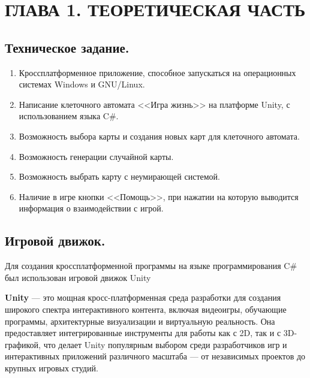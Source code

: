 \chapter{\label{ch:ch01}ГЛАВА 1. ТЕОРЕТИЧЕСКАЯ ЧАСТЬ} %

\section{\label{sec:ch01/sec01}Техническое задание.}
\begin{enumerate}
	\item Кроссплатформенное приложение, способное запускаться на операционных системах Windows и GNU/Linux.
	\item Написание клеточного автомата <<Игра жизнь>> на платформе Unity, с использованием языка C\#.
	\item Возможность выбора карты и создания новых карт для клеточного автомата.
	\item Возможность генерации случайной карты.
        \item Возможность выбрать карту с неумирающей системой.
	\item Наличие в игре кнопки <<Помощь>>, при нажатии на которую выводится информация о взаимодействии с игрой.
\end{enumerate}

\section{\label{sec:ch01/sec02}Игровой движок.}
Для создания кроссплатформенной программы на языке программирования C\# был использован игровой движок Unity

\textbf{Unity} --- это мощная кросс-платформенная среда разработки для создания широкого спектра интерактивного контента, включая видеоигры, обучающие программы, архитектурные визуализации и виртуальную реальность. Она предоставляет интегрированные инструменты для работы как с 2D, так и с 3D-графикой, что делает Unity популярным выбором среди разработчиков игр и интерактивных приложений различного масштаба — от независимых проектов до крупных игровых студий.


